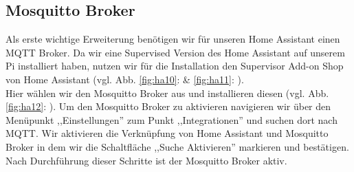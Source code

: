 \subsection{Mosquitto Broker}\label{sw_mqtt-broker}
Als erste wichtige Erweiterung benötigen wir für unseren Home Assistant einen MQTT Broker. 
Da wir eine Supervised Version des Home Assistant auf unserem Pi installiert haben, nutzen wir für die Installation den Supervisor Add-on Shop von Home Assistant (vgl. Abb. \ref{fig:ha10}:  \& \ref{fig:ha11}: ).\\
\noindent Hier wählen wir den Mosquitto Broker aus und installieren diesen (vgl. Abb. \ref{fig:ha12}: ). 
Um den Mosquitto Broker zu aktivieren navigieren wir über den Menüpunkt ,,Einstellungen'' zum Punkt ,,Integrationen'' und suchen dort nach MQTT. 
Wir aktivieren die Verknüpfung von Home Assistant und Mosquitto Broker in dem wir die Schaltfläche ,,Suche Aktivieren'' markieren und bestätigen.
Nach Durchführung dieser Schritte ist der Mosquitto Broker aktiv.
